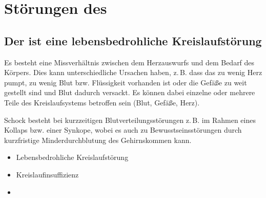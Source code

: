 \section{Störungen des }
\subsection{Der  ist eine lebensbedrohliche Kreislaufstörung}
\label{topic:schock}

\TextSlide
{{\TxBeschreibung}}
{%
Es besteht eine
Missverhältnis zwischen dem Herzauswurfs und dem Bedarf des
Körpers. Dies kann unterschiedliche Ursachen haben, z.\,B.
dass das  zu wenig Herz pumpt, zu wenig Blut bzw.
Flüssigkeit vorhanden ist oder die Gefäße zu weit gestellt
sind und Blut dadurch versackt.
Es können dabei einzelne oder mehrere Teile des
Kreislaufsystems betroffen sein  (Blut, Gefäße, Herz). 

 Schock besteht bei kurzzeitigen
Blutverteilungsstörungen z.\,B. im Rahmen eines Kollaps
bzw. einer Synkope, wobei es auch zu Bewusstseinsstörungen
durch kurzfristige Minderdurchblutung des Gehirnskommen
kann.}
{%
\begin{itemize}
  \item Lebensbedrohliche Kreislaufstörung
  \item Kreislaufinsuffizienz 
  \item {}
\end{itemize}
}
{}
{}
{}


\begin{Synopsis}
\end{Synopsis}







